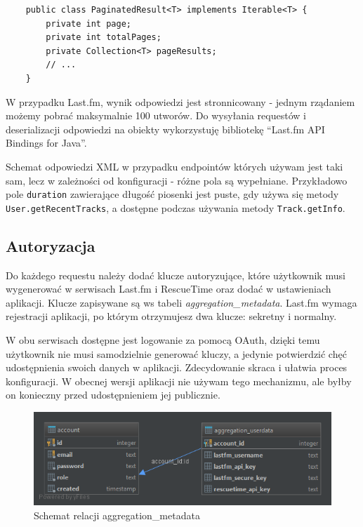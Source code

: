 \documentclass[openright]{xmgr}
\begin{document}
            \begin{verbatim}
    public class PaginatedResult<T> implements Iterable<T> {
        private int page;
        private int totalPages;
        private Collection<T> pageResults;
        // ...
    }
            \end{verbatim}

            W przypadku Last.fm, wynik odpowiedzi jest stronnicowany - jednym rządaniem możemy pobrać maksymalnie 100 utworów.
            Do wysyłania requestów i deserializacji odpowiedzi na obiekty
            wykorzystuję bibliotekę ``Last.fm API Bindings for Java''\cite{lastfm:java-bindings}.

            Schemat odpowiedzi XML w przypadku endpointów których używam jest taki sam, lecz w zależności od konfiguracji - różne pola są wypełniane.
            Przykładowo pole \verb|duration| zawierające długość piosenki jest puste, gdy używa się metody \verb|User.getRecentTracks|,
            a dostępne podczas używania metody \verb|Track.getInfo|.

        \subsection*{Autoryzacja}

        Do każdego requestu należy dodać klucze autoryzujące,
        które użytkownik musi wygenerować w serwisach Last.fm i RescueTime \cite{rescuetime:apidoc-keymanagment} oraz dodać w ustawieniach aplikacji.
        Klucze zapisywane są ws tabeli \textit{aggregation\_metadata}.
        Last.fm wymaga rejestracji aplikacji, po którym otrzymujesz dwa klucze: sekretny i normalny.

        W obu serwisach dostępne jest logowanie za pomocą OAuth, dzięki temu użytkownik nie musi samodzielnie generować kluczy,
        a jedynie potwierdzić chęć udostępnienia swoich danych w aplikacji. Zdecydowanie skraca i ułatwia proces konfiguracji.
        W obecnej wersji aplikacji nie używam tego mechanizmu, ale byłby on konieczny przed udostępnieniem jej publicznie.

        \begin{figure}
        	\includegraphics[width=\linewidth]{fig/db-aggregation-metadata.png}
        	\caption{Schemat relacji aggregation\_metadata}
        	\label{fig:db-aggregation-metadata}
        \end{figure}
\end{document}
